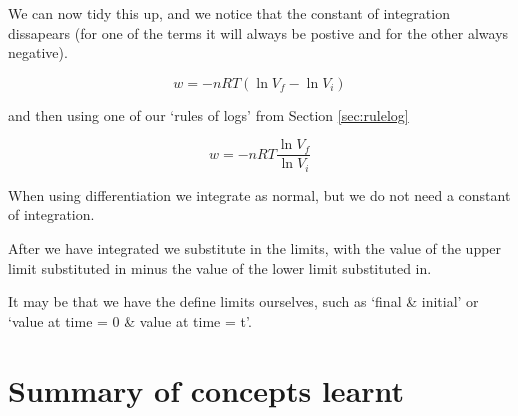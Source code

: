 \documentclass[
]{book}
\begin{document}
We can now tidy this up, and we notice that the constant of integration dissapears (for one of the terms it will always be postive and for the other always negative).

\begin{equation*}
w = -nRT (\ln V_f - \ln V_i)
\end{equation*}

and then using one of our `rules of logs' from Section \ref{sec:rulelog}

\begin{equation*}
w = -nRT \frac{\ln V_f}{\ln V_i}
\end{equation*}

When using differentiation we integrate as normal, but we do not need a constant of integration.

After we have integrated we substitute in the limits, with the value of the upper limit substituted in minus the value of the lower limit substituted in.

It may be that we have the define limits ourselves, such as `final \& initial' or `value at time = 0 \& value at time = t'.

\hypertarget{summary-of-concepts-learnt-2}{%
\section{Summary of concepts learnt}\label{summary-of-concepts-learnt-2}}
\end{document}
